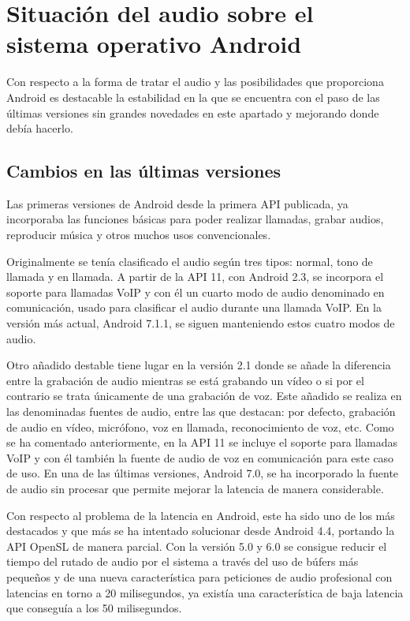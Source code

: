 \section{Situación del audio sobre el sistema operativo Android}
Con respecto a la forma de tratar el audio y las posibilidades que proporciona Android es destacable la estabilidad en la que se encuentra con el paso de las últimas versiones sin grandes novedades en este apartado y mejorando donde debía hacerlo.


\subsection{Cambios en las últimas versiones}
Las primeras versiones de Android desde la primera \gls{API} publicada, ya incorporaba las funciones básicas para poder realizar llamadas, grabar audios, reproducir música y otros muchos usos convencionales. 

Originalmente se tenía clasificado el audio según tres tipos: normal, tono de llamada y en llamada. A partir de la \gls{API} 11, con Android 2.3, se incorpora el soporte para llamadas \gls{VoIP} y con él un cuarto modo de audio denominado en comunicación, usado para clasificar el audio durante una llamada \gls{VoIP}. En la versión más actual, Android 7.1.1, se siguen manteniendo estos cuatro modos de audio.

Otro añadido destable tiene lugar en la versión 2.1 donde se añade la diferencia entre la grabación de audio mientras se está grabando un vídeo o si por el contrario se trata únicamente de una grabación de voz. Este añadido se realiza en las denominadas fuentes de audio, entre las que destacan: por defecto, grabación de audio en vídeo, micrófono, voz en llamada, reconocimiento de voz, etc. Como se ha comentado anteriormente, en la \gls{API} 11 se incluye el soporte para llamadas \gls{VoIP} y con él también la fuente de audio de voz en comunicación para este caso de uso. En una de las últimas versiones, Android 7.0, se ha incorporado la fuente de audio sin procesar que permite mejorar la latencia de manera considerable.

Con respecto al problema de la latencia en Android, este ha sido uno de los más destacados y que más se ha intentado solucionar desde Android 4.4, portando la \gls{API} OpenSL de manera parcial. Con la versión 5.0 y 6.0 se consigue reducir el tiempo del rutado de audio por el sistema a través del uso de búfers más pequeños y de una nueva característica para peticiones de audio profesional con latencias en torno a 20 milisegundos, ya existía una característica de baja latencia que conseguía a los 50 milisegundos.

